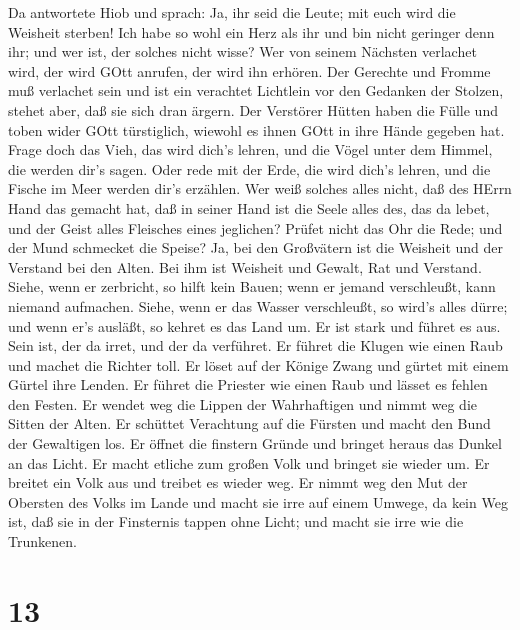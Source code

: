  Da antwortete Hiob und sprach:  Ja, ihr seid
die Leute; mit euch wird die Weisheit sterben!  Ich habe so
wohl ein Herz als ihr und bin nicht geringer denn ihr; und wer ist, der
solches nicht wisse?  Wer von seinem Nächsten verlachet
wird, der wird GOtt anrufen, der wird ihn erhören. Der Gerechte und
Fromme muß verlachet sein  und ist ein verachtet Lichtlein
vor den Gedanken der Stolzen, stehet aber, daß sie sich dran ärgern.
 Der Verstörer Hütten haben die Fülle und toben wider GOtt
türstiglich, wiewohl es ihnen GOtt in ihre Hände gegeben hat.
 Frage doch das Vieh, das wird dich's lehren, und die Vögel
unter dem Himmel, die werden dir's sagen.  Oder rede mit der
Erde, die wird dich's lehren, und die Fische im Meer werden dir's
erzählen.  Wer weiß solches alles nicht, daß des HErrn Hand
das gemacht hat,  daß in seiner Hand ist die Seele alles
des, das da lebet, und der Geist alles Fleisches eines jeglichen?
 Prüfet nicht das Ohr die Rede; und der Mund schmecket die
Speise?  Ja, bei den Großvätern ist die Weisheit und der
Verstand bei den Alten.  Bei ihm ist Weisheit und Gewalt,
Rat und Verstand.  Siehe, wenn er zerbricht, so hilft kein
Bauen; wenn er jemand verschleußt, kann niemand aufmachen. 
Siehe, wenn er das Wasser verschleußt, so wird's alles dürre; und wenn
er's ausläßt, so kehret es das Land um.  Er ist stark und
führet es aus. Sein ist, der da irret, und der da verführet.
 Er führet die Klugen wie einen Raub und machet die Richter
toll.  Er löset auf der Könige Zwang und gürtet mit einem
Gürtel ihre Lenden.  Er führet die Priester wie einen Raub
und lässet es fehlen den Festen.  Er wendet weg die Lippen
der Wahrhaftigen und nimmt weg die Sitten der Alten.  Er
schüttet Verachtung auf die Fürsten und macht den Bund der Gewaltigen
los.  Er öffnet die finstern Gründe und bringet heraus das
Dunkel an das Licht.  Er macht etliche zum großen Volk und
bringet sie wieder um. Er breitet ein Volk aus und treibet es wieder
weg.  Er nimmt weg den Mut der Obersten des Volks im Lande
und macht sie irre auf einem Umwege, da kein Weg ist,  daß
sie in der Finsternis tappen ohne Licht; und macht sie irre wie die
Trunkenen.

\hypertarget{section-12}{%
\section{13}\label{section-12}}

